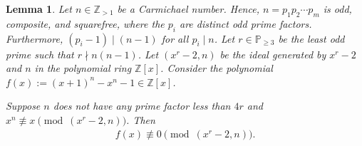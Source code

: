 \documentclass{article}
\theoremstyle{plain}
\newtheorem{lemma}[theorem]{Lemma}
\theoremstyle{definition}
\newcommand{\Z}{\mathbb{Z}}
\begin{document}
\begin{lemma} \label{proof:carmichaelnumbersfail}
Let $n \in \Z_{>1}$ be a Carmichael number. Hence, $n = p_1 p_2 \cdots p_m$ is odd, composite, and squarefree, where the $p_i$ are distinct odd prime factors. Furthermore, $(p_i-1) \mid (n-1)$ for all $p_i \mid n$. Let $r \in \mathbb{P}_{\geq 3}$ be the least odd prime such that $r \nmid n (n-1)$. Let $(x^r-2, n)$ be the ideal generated by $x^r-2$ and $n$ in the polynomial ring $\Z[x]$. Consider the polynomial $f(x) := (x+1)^n - x^n - 1 \in \Z[x]$.

Suppose $n$ does not have any prime factor less than $4r$ and $x^n \not\equiv x \pmod{(x^r-2,n)}$. Then
\begin{align*}
    f(x) \not\equiv 0 \pmod{(x^r-2, n)} .
\end{align*}
\end{lemma}
\end{document}
